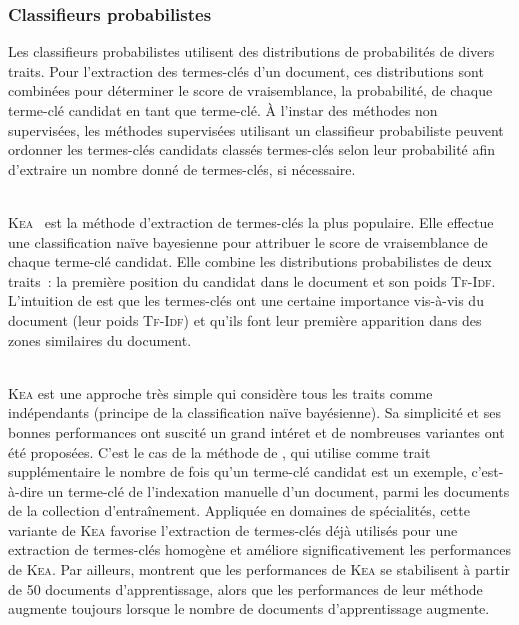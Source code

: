       \subsubsection{Classifieurs probabilistes}
      \label{subsubsec:main-state_of_the_art-automatic_keyphrase_extraction-supervised_keyphrase_extraction-probabilistic_models}
        Les classifieurs probabilistes utilisent des distributions de
        probabilités de divers traits. Pour l'extraction des termes-clés d'un
        document, ces distributions sont combinées pour déterminer le score de
        vraisemblance, la probabilité, de chaque terme-clé candidat en tant que
        \og{}terme-clé\fg{}. À l'instar des méthodes non supervisées, les
        méthodes supervisées utilisant un classifieur probabiliste peuvent
        ordonner les termes-clés candidats classés \og{}termes-clés\fg{} selon
        leur probabilité afin d'extraire un nombre donné de termes-clés, si
        nécessaire.

        ~\\\textsc{Kea}~\cite{witten1999kea} est la méthode d'extraction de
        termes-clés la plus populaire. Elle effectue une classification naïve
        bayesienne pour attribuer le score de vraisemblance de chaque terme-clé
        candidat. Elle combine les distributions probabilistes de deux traits~:
        la première position du candidat dans le document et son poids
        \textsc{Tf-Idf}. L'intuition de  est que les
        termes-clés ont une certaine importance vis-à-vis du document (leur
        poids \textsc{Tf-Idf}) et qu'ils font leur première apparition dans des
        zones similaires du document.

        ~\\\textsc{Kea} est une approche très simple qui considère tous les
        traits comme indépendants (principe de la classification naïve
        bayésienne). Sa simplicité et ses bonnes performances ont suscité un
        grand intéret et de nombreuses variantes ont été proposées. C'est le cas
        de la méthode de , qui utilise comme
        trait supplémentaire le nombre de fois qu'un terme-clé candidat est un
        exemple, c'est-à-dire un terme-clé de l'indexation manuelle d'un
        document, parmi les documents de la collection d'entraînement. Appliquée
        en domaines de spécialités, cette variante de \textsc{Kea} favorise
        l'extraction de termes-clés déjà utilisés pour une extraction de
        termes-clés homogène et améliore significativement les performances de
        \textsc{Kea}. Par ailleurs,  montrent que
        les performances de \textsc{Kea} se stabilisent à partir de 50 documents
        d'apprentissage, alors que les performances de leur méthode augmente
        toujours lorsque le nombre de documents d'apprentissage augmente.
        
